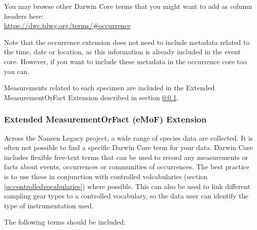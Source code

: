 \documentclass[a4paper,english, 11pt]{article}
\begin{document}
You may browse other Darwin Core terms that you might want to add as column headers here:\\
\url{https://dwc.tdwg.org/terms/#occurrence}

Note that the occurrence extension does not need to include metadata related to the time, date or location, as this information is already included in the event core. However, if you want to include these metadata in the occurrence core too you can.

Measurements related to each specimen are included in the Extended MeasurementOrFact Extension described in section \ref{ss:emofextension}.

\subsubsection{Extended MeasurementOrFact (eMoF) Extension}
\label{ss:emofextension}

Across the Nansen Legacy project, a wide range of species data are collected. It is often not possible to find a specific Darwin Core term for your data. Darwin Core includes flexible free-text terms that can be used to record any measurements or facts about events, occurrences or communities of occurrences. The best practice is to use these in conjunction with controlled volcabularies (section \ref{ss:controlledvocabularies}) where possible. This can also be used to link different sampling gear types to a controlled vocabulary, so the data user can identify the type of instrumentation used.

The following terms should be included:
\end{document}
